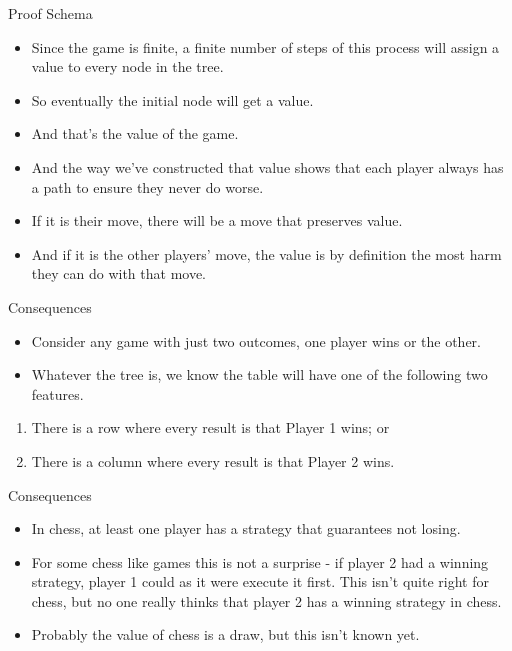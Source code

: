 \documentclass[
  ignorenonframetext,
]{beamer}
\providecommand{\tightlist}{%
  \setlength{\itemsep}{0pt}\setlength{\parskip}{0pt}}
\begin{document}
\begin{frame}{Proof Schema}
\protect\hypertarget{proof-schema-1}{}
\begin{itemize}
\tightlist
\item
  Since the game is finite, a finite number of steps of this process
  will assign a value to every node in the tree.
\item
  So eventually the initial node will get a value.
\item
  And that's the value of the game.
\item
  And the way we've constructed that value shows that each player always
  has a path to ensure they never do worse.
\item
  If it is their move, there will be a move that preserves value.
\item
  And if it is the other players' move, the value is by definition the
  most harm they can do with that move.
\end{itemize}
\end{frame}

\begin{frame}{Consequences}
\protect\hypertarget{consequences}{}
\begin{itemize}
\tightlist
\item
  Consider any game with just two outcomes, one player wins or the
  other.
\item
  Whatever the tree is, we know the table will have one of the following
  two features.
\end{itemize}

\begin{enumerate}
\tightlist
\item
  There is a row where every result is that Player 1 wins; or
\item
  There is a column where every result is that Player 2 wins.
\end{enumerate}
\end{frame}

\begin{frame}{Consequences}
\protect\hypertarget{consequences-1}{}
\begin{itemize}[<+->]
\tightlist
\item
  In chess, at least one player has a strategy that guarantees not
  losing.
\item
  For some chess like games this is not a surprise - if player 2 had a
  winning strategy, player 1 could as it were execute it first. This
  isn't quite right for chess, but no one really thinks that player 2
  has a winning strategy in chess.
\item
  Probably the value of chess is a draw, but this isn't known yet.
\end{itemize}
\end{frame}
\end{document}
